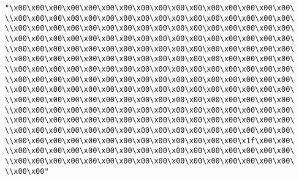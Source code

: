 \verb|"\x00\x00\x00\x00\x00\x00\x00\x00\x00\x00\x00\x00\x00\x00\x00\x00\|\newline
\verb|\\x00\x00\x00\x00\x00\x00\x00\x00\x00\x00\x00\x00\x00\x00\x00\x00\|\newline
\verb|\\x00\x00\x00\x00\x00\x00\x00\x00\x00\x00\x00\x00\x00\x00\x00\x00\|\newline
\verb|\\x00\x00\x00\x00\x00\x00\x00\x00\x00\x00\x00\x00\x00\x00\x00\x00\|\newline
\verb|\\x00\x00\x00\x00\x00\x00\x00\x00\x00\x00\x00\x00\x00\x00\x00\x00\|\newline
\verb|\\x00\x00\x00\x00\x00\x00\x00\x00\x00\x00\x00\x00\x00\x00\x00\x00\|\newline
\verb|\\x00\x00\x00\x00\x00\x00\x00\x00\x00\x00\x00\x00\x00\x00\x00\x00\|\newline
\verb|\\x00\x00\x00\x00\x00\x00\x00\x00\x00\x00\x00\x00\x00\x00\x00\x00\|\newline
\verb|\\x00\x00\x00\x00\x00\x00\x00\x00\x00\x00\x00\x00\x00\x00\x00\x00\|\newline
\verb|\\x00\x00\x00\x00\x00\x00\x00\x00\x00\x00\x00\x00\x00\x00\x00\x00\|\newline
\verb|\\x00\x00\x00\x00\x00\x00\x00\x00\x00\x00\x00\x00\x00\x00\x00\x00\|\newline
\verb|\\x00\x00\x00\x00\x00\x00\x00\x00\x00\x00\x00\x00\x00\x00\x00\x00\|\newline
\verb|\\x00\x00\x00\x00\x00\x00\x00\x00\x00\x00\x00\x00\x00\x00\x00\x00\|\newline
\verb|\\x00\x00\x00\x00\x00\x00\x00\x00\x00\x00\x00\x00\x00\x1f\x00\x00\|\newline
\verb|\\x00\x00\x00\x00\x00\x00\x00\x00\x00\x00\x00\x00\x00\x00\x00\x00\|\newline
\verb|\\x00\x00\x00\x00\x00\x00\x00\x00\x00\x00\x00\x00\x00\x00\x00\x00\|\newline
\verb|\\x00\x00"|\newline
